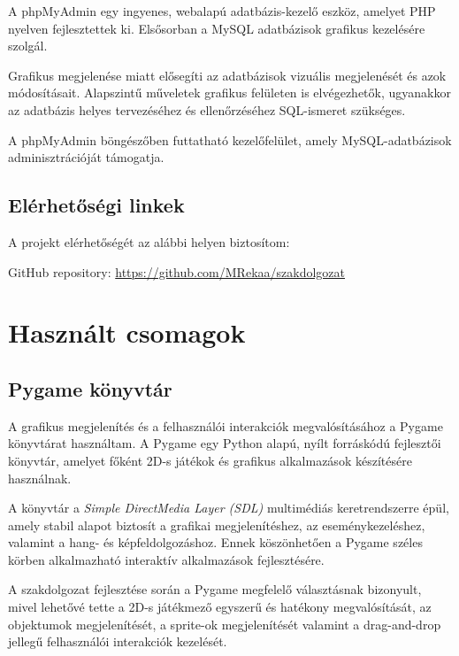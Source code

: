 \documentclass[]{thesis-ekf}
\begin{document}
	A phpMyAdmin\cite{phpMyAdmin} egy ingyenes, webalapú adatbázis-kezelő eszköz, amelyet PHP nyelven fejlesztettek ki. Elsősorban a MySQL adatbázisok grafikus kezelésére szolgál.
	
	Grafikus megjelenése miatt elősegíti az adatbázisok vizuális megjelenését és azok módosításait. Alapszintű műveletek grafikus felületen is elvégezhetők, ugyanakkor az adatbázis helyes tervezéséhez és ellenőrzéséhez SQL-ismeret szükséges.
	
	A phpMyAdmin böngészőben futtatható kezelőfelület, amely MySQL-adatbázisok adminisztrációját támogatja.
	
	
	\subsection{Elérhetőségi linkek}
	
	A projekt elérhetőségét az alábbi helyen biztosítom:
	
	GitHub repository: \url{https://github.com/MRekaa/szakdolgozat} 
	
	\section{Használt csomagok} 
	
	\subsection{Pygame könyvtár}
	
	A grafikus megjelenítés és a felhasználói interakciók megvalósításához a Pygame\cite{PyGame2} könyvtárat használtam. A Pygame egy Python alapú, nyílt forráskódú fejlesztői könyvtár, amelyet főként 2D-s játékok és grafikus alkalmazások készítésére használnak.
	
	A könyvtár a \textit{Simple DirectMedia Layer (SDL)}\cite{SDL} multimédiás keretrendszerre épül, amely stabil alapot biztosít a grafikai megjelenítéshez, az eseménykezeléshez, valamint a hang- és képfeldolgozáshoz. Ennek köszönhetően a Pygame széles körben alkalmazható interaktív alkalmazások fejlesztésére.
	
	A szakdolgozat fejlesztése során a Pygame megfelelő választásnak bizonyult, mivel lehetővé tette a 2D-s játékmező egyszerű és hatékony megvalósítását, az objektumok megjelenítését, a sprite-ok megjelenítését valamint a drag-and-drop jellegű felhasználói interakciók kezelését.
	
\end{document}
